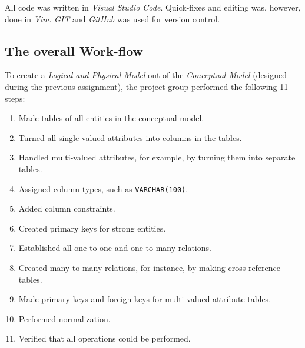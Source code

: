 \documentclass[a4paper]{scrartcl}
\begin{document}
All code was written in \emph{Visual Studio Code}.
Quick-fixes and editing was, however, done in \emph{Vim}. 
\emph{GIT} and \emph{GitHub} was used for version control.

\subsection*{The overall Work-flow}
To create a \emph{Logical and Physical Model} out of the
\emph{Conceptual Model} (designed during the previous assignment),
the project group performed the following 11 steps:
\begin{enumerate}
  \item Made tables of all entities in the conceptual model.
  \item Turned all single-valued attributes into columns in the tables.
  \item Handled multi-valued attributes, for example, by turning them into separate tables.
  \item Assigned column types, such as \texttt{VARCHAR(100)}.
  \item Added column constraints.
  \item Created primary keys for strong entities.
  \item Established all one-to-one and one-to-many relations.
  \item Created many-to-many relations, for instance, by making cross-reference tables.
  \item Made primary keys and foreign keys for multi-valued attribute tables.
  \item Performed normalization.
  \item Verified that all operations could be performed.
\end{enumerate}
\end{document}

